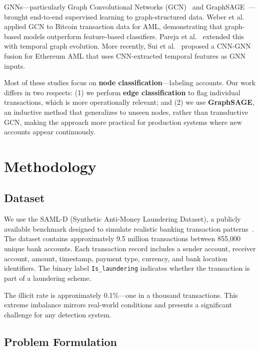 \documentclass[conference]{IEEEtran}
\begin{document}
GNNs—particularly Graph Convolutional Networks (GCN)~\cite{kipf2017gcn} and GraphSAGE~\cite{hamilton2017graphsage}—brought end-to-end supervised learning to graph-structured data. Weber et al.~\cite{weber2019bitcoin} applied GCN to Bitcoin transaction data for AML, demonstrating that graph-based models outperform feature-based classifiers. Pareja et al.~\cite{pareja2020evolvegcn} extended this with temporal graph evolution. More recently, Sui et al.~\cite{sui2025cnngnn} proposed a CNN-GNN fusion for Ethereum AML that uses CNN-extracted temporal features as GNN inputs.

Most of these studies focus on \textbf{node classification}—labeling accounts. Our work differs in two respects: (1) we perform \textbf{edge classification} to flag individual transactions, which is more operationally relevant; and (2) we use \textbf{GraphSAGE}, an inductive method that generalizes to unseen nodes, rather than transductive GCN, making the approach more practical for production systems where new accounts appear continuously.


\section{Methodology}\label{sec:method}

\subsection{Dataset}

We use the SAML-D (Synthetic Anti-Money Laundering Dataset), a publicly available benchmark designed to simulate realistic banking transaction patterns~\cite{altman2023saml}. The dataset contains approximately 9.5 million transactions between 855{,}000 unique bank accounts. Each transaction record includes a sender account, receiver account, amount, timestamp, payment type, currency, and bank location identifiers. The binary label \texttt{Is\_laundering} indicates whether the transaction is part of a laundering scheme.

The illicit rate is approximately 0.1\%---one in a thousand transactions. This extreme imbalance mirrors real-world conditions and presents a significant challenge for any detection system.

\subsection{Problem Formulation}
\end{document}
